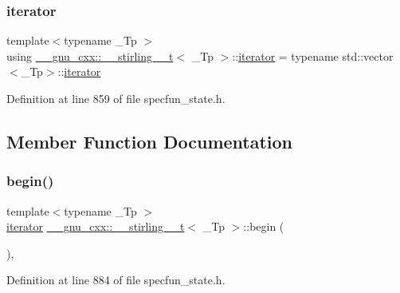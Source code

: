 \subsubsection{\texorpdfstring{iterator}{iterator}}
{\footnotesize\ttfamily template$<$typename \+\_\+\+Tp $>$ \\
using \hyperlink{struct____gnu__cxx_1_1____stirling__2__t}{\+\_\+\+\_\+gnu\+\_\+cxx\+::\+\_\+\+\_\+stirling\+\_\+\_\+t}$<$ \+\_\+\+Tp $>$\+::\hyperlink{struct____gnu__cxx_1_1____stirling__2__t_aa7fda155fac4d993df6fc7deb4a66e84}{iterator} =  typename std\+::vector$<$\+\_\+\+Tp$>$\+::\hyperlink{struct____gnu__cxx_1_1____stirling__2__t_aa7fda155fac4d993df6fc7deb4a66e84}{iterator}}



Definition at line 859 of file specfun\+\_\+state.\+h.



\subsection{Member Function Documentation}
\mbox{\label{struct____gnu__cxx_1_1____stirling__2__t_ad4db5efb6fff1c30da5632caaf320b5b}} 
\subsubsection{\texorpdfstring{begin()}{begin()}\hspace{0.1cm}{\footnotesize\ttfamily [1/2]}}
{\footnotesize\ttfamily template$<$typename \+\_\+\+Tp $>$ \\
\hyperlink{struct____gnu__cxx_1_1____stirling__2__t_aa7fda155fac4d993df6fc7deb4a66e84}{iterator} \hyperlink{struct____gnu__cxx_1_1____stirling__2__t}{\+\_\+\+\_\+gnu\+\_\+cxx\+::\+\_\+\+\_\+stirling\+\_\+\_\+t}$<$ \+\_\+\+Tp $>$\+::begin (\begin{DoxyParamCaption}{ }\end{DoxyParamCaption})\hspace{0.3cm}{\ttfamily [inline]}, {\ttfamily [noexcept]}}



Definition at line 884 of file specfun\+\_\+state.\+h.

